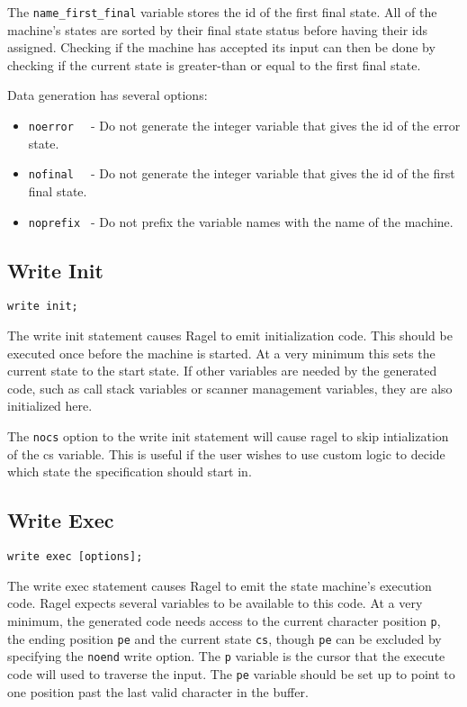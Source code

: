\documentclass[letterpaper,11pt,oneside]{book}
\newcommand{\verbspace}{\vspace{10pt}}
\begin{document}
The \verb|name_first_final| variable stores the id of the first final state. All of the
machine's states are sorted by their final state status before having their ids
assigned. Checking if the machine has accepted its input can then be done by
checking if the current state is greater-than or equal to the first final
state.

Data generation has several options:

\begin{itemize}
\setlength{\itemsep}{-2mm}
\item \verb|noerror  | - Do not generate the integer variable that gives the
id of the error state.
\item \verb|nofinal  | - Do not generate the integer variable that gives the
id of the first final state.
\item \verb|noprefix | - Do not prefix the variable names with the name of the
machine.
\end{itemize}

\subsection{Write Init}
\begin{verbatim}
write init;
\end{verbatim}
\verbspace

The write init statement causes Ragel to emit initialization code. This should
be executed once before the machine is started. At a very minimum this sets the
current state to the start state. If other variables are needed by the
generated code, such as call stack variables or scanner management
variables, they are also initialized here.

The \verb|nocs| option to the write init statement will cause ragel to skip
intialization of the cs variable. This is useful if the user wishes to use
custom logic to decide which state the specification should start in.

\subsection{Write Exec}
\begin{verbatim}
write exec [options];
\end{verbatim}
\verbspace

The write exec statement causes Ragel to emit the state machine's execution code.
Ragel expects several variables to be available to this code. At a very minimum, the
generated code needs access to the current character position \verb|p|, the ending
position \verb|pe| and the current state \verb|cs|, though \verb|pe|
can be excluded by specifying the \verb|noend| write option.
The \verb|p| variable is the cursor that the execute code will
used to traverse the input. The \verb|pe| variable should be set up to point to one
position past the last valid character in the buffer.
\end{document}
